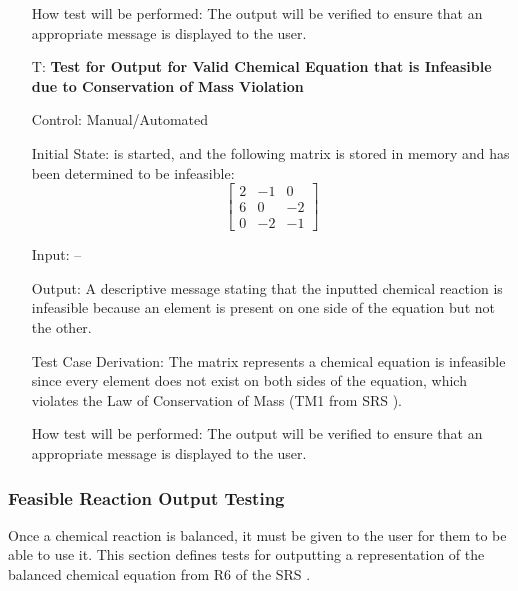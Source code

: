 \documentclass[12pt, titlepage]{article}
\newcounter{testnum} %
\begin{document}
\begin{enumerate}
    How test will be performed: The output will be verified to ensure that an
    appropriate message is displayed to the user.

  \item[T\refstepcounter{testnum}\thetestnum \label{test_cons_mass_valid_out}:]
    \textbf{Test for Output for Valid Chemical Equation that is Infeasible
      due to Conservation of Mass Violation}

    Control: Manual/Automated 

    Initial State: \progname{} is started, and the following matrix is
    stored in memory and has been determined to be infeasible:
    $$\begin{bmatrix}
        2 & -1 & 0  \\
        6 & 0  & -2 \\
        0 & -2 & -1
      \end{bmatrix}$$

    Input: --

    Output: A descriptive message stating that the inputted chemical reaction
    is infeasible because an element is present on one side of the equation but
    not the other. 

    Test Case Derivation: The matrix represents a chemical equation is
    infeasible since
    every element does not exist on both sides of the equation, which violates
    the Law of Conservation of Mass (TM1 from SRS ).

    How test will be performed: The output will be verified to ensure that an
    appropriate message is displayed to the user.
\end{enumerate}

\subsubsection{Feasible Reaction Output Testing}

Once a chemical reaction is balanced, it must be given to the user for them
to be able to use it. This section defines tests for outputting a
representation of the balanced chemical equation from
R6 of the SRS . 
\end{document}
